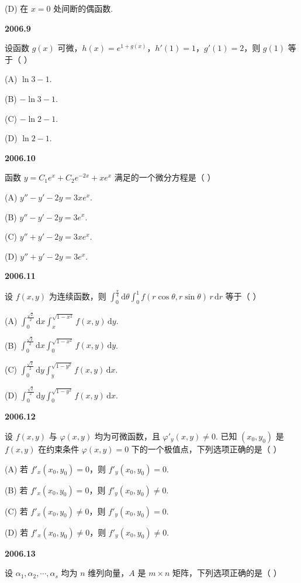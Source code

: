\documentclass[UTF8,12pt,fontset=windows]{ctexart}
\begin{document}
(D) 在 $x = 0$ 处间断的偶函数.

\vfill
\newpage
{\large\bfseries 2006.9}

设函数 $g(x)$ 可微，$h(x) = e^{1+g(x)}$，$h'(1) = 1$，$g'(1) = 2$，则 $g(1)$ 等于（ ）

(A) $\ln 3 - 1$.

(B) $-\ln 3 - 1$.

(C) $-\ln 2 - 1$.

(D) $\ln 2 - 1$.

\vfill
\newpage
{\large\bfseries 2006.10}

函数 $y = C_1 e^x + C_2 e^{-2x} + xe^x$ 满足的一个微分方程是（ ）

(A) $y'' - y' - 2y = 3xe^x$.

(B) $y'' - y' - 2y = 3e^x$.

(C) $y'' + y' - 2y = 3xe^x$.

(D) $y'' + y' - 2y = 3e^x$.

\vfill
\newpage
{\large\bfseries 2006.11}

设 $f(x,y)$ 为连续函数，则 $\displaystyle\int_0^{\frac{\pi}{4}}\mathrm{d}\theta\int_0^1 f(r\cos\theta, r\sin\theta)\,r\,\mathrm{d}r$ 等于（ ）

(A) $\displaystyle\int_0^{\frac{\sqrt{2}}{2}}\mathrm{d}x\int_x^{\sqrt{1-x^2}} f(x,y)\,\mathrm{d}y$.

(B) $\displaystyle\int_0^{\frac{\sqrt{2}}{2}}\mathrm{d}x\int_0^{\sqrt{1-x^2}} f(x,y)\,\mathrm{d}y$.

(C) $\displaystyle\int_0^{\frac{\sqrt{2}}{2}}\mathrm{d}y\int_y^{\sqrt{1-y^2}} f(x,y)\,\mathrm{d}x$.

(D) $\displaystyle\int_0^{\frac{\sqrt{2}}{2}}\mathrm{d}y\int_0^{\sqrt{1-y^2}} f(x,y)\,\mathrm{d}x$.

\vfill
\newpage
{\large\bfseries 2006.12}

设 $f(x,y)$ 与 $\varphi(x,y)$ 均为可微函数，且 $\varphi'_y(x,y) \neq 0$. 已知 $(x_0,y_0)$ 是 $f(x,y)$ 在约束条件 $\varphi(x,y) = 0$ 下的一个极值点，下列选项正确的是（ ）

(A) 若 $f'_x(x_0,y_0) = 0$，则 $f'_y(x_0,y_0) = 0$.

(B) 若 $f'_x(x_0,y_0) = 0$，则 $f'_y(x_0,y_0) \neq 0$.

(C) 若 $f'_x(x_0,y_0) \neq 0$，则 $f'_y(x_0,y_0) = 0$.

(D) 若 $f'_x(x_0,y_0) \neq 0$，则 $f'_y(x_0,y_0) \neq 0$.

\vfill
\newpage
{\large\bfseries 2006.13}

设 $\alpha_1,\alpha_2,\cdots,\alpha_s$ 均为 $n$ 维列向量，$A$ 是 $m \times n$ 矩阵，下列选项正确的是（ ）
\end{document}
